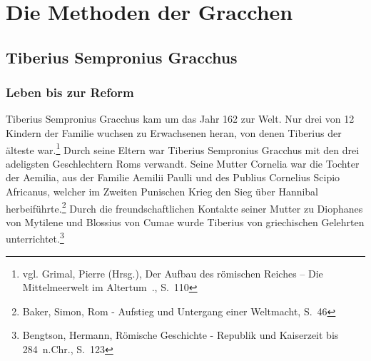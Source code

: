 \documentclass[
    12pt,
    smallheadings,
    ]{scrreprt}
\newcommand{\RM}[1]{\MakeUppercase{\romannumeral #1}}
\begin{document}

\chapter{Die Methoden der Gracchen}
    \section{Tiberius Sempronius Gracchus}
        \subsection{Leben bis zur Reform}
Tiberius Sempronius Gracchus kam um das Jahr 162 zur Welt.
Nur drei von 12 Kindern der Familie wuchsen zu Erwachsenen heran, von denen Tiberius der älteste war.\footnote{vgl. Grimal, Pierre (Hrsg.), Der Aufbau des römischen Reiches -- Die Mittelmeerwelt im Altertum~\RM{3}., S.~110}
Durch seine Eltern war Tiberius Sempronius Gracchus mit den drei adeligsten Geschlechtern Roms verwandt.
Seine Mutter Cornelia war die Tochter der Aemilia, aus der Familie Aemilii Paulli und des Publius Cornelius Scipio Africanus, welcher im Zweiten Punischen Krieg den Sieg über Hannibal herbeiführte.\footnote{Baker, Simon, Rom - Aufstieg und Untergang einer Weltmacht, S.~46}
Durch die freundschaftlichen Kontakte seiner Mutter zu Diophanes von Mytilene und Blossius von Cumae wurde Tiberius von griechischen Gelehrten unterrichtet.\footnote{Bengtson, Hermann, Römische Geschichte - Republik und Kaiserzeit bis 284~n.Chr., S.~123}
\end{document}
